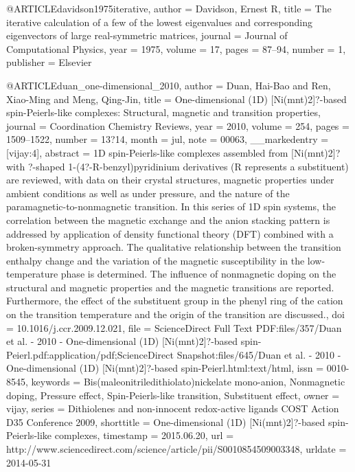 @ARTICLE{davidson1975iterative,
  author = {Davidson, Ernest R},
  title = {The iterative calculation of a few of the lowest eigenvalues and
	corresponding eigenvectors of large real-symmetric matrices},
  journal = {Journal of Computational Physics},
  year = {1975},
  volume = {17},
  pages = {87--94},
  number = {1},
  publisher = {Elsevier}
}

@ARTICLE{duan_one-dimensional_2010,
  author = {Duan, Hai-Bao and Ren, Xiao-Ming and Meng, Qing-Jin},
  title = {One-dimensional (1D) [{Ni}(mnt)2]?-based spin-{Peierls}-like complexes:
	{Structural}, magnetic and transition properties},
  journal = {Coordination Chemistry Reviews},
  year = {2010},
  volume = {254},
  pages = {1509--1522},
  number = {13?14},
  month = jul,
  note = {00063},
  __markedentry = {[vijay:4]},
  abstract = {1D spin-Peierls-like complexes assembled from [Ni(mnt)2]? with ?-shaped
	1-(4?-R-benzyl)pyridinium derivatives (R represents a substituent)
	are reviewed, with data on their crystal structures, magnetic properties
	under ambient conditions as well as under pressure, and the nature
	of the paramagnetic-to-nonmagnetic transition. In this series of
	1D spin systems, the correlation between the magnetic exchange and
	the anion stacking pattern is addressed by application of density
	functional theory (DFT) combined with a broken-symmetry approach.
	The qualitative relationship between the transition enthalpy change
	and the variation of the magnetic susceptibility in the low-temperature
	phase is determined. The influence of nonmagnetic doping on the structural
	and magnetic properties and the magnetic transitions are reported.
	Furthermore, the effect of the substituent group in the phenyl ring
	of the cation on the transition temperature and the origin of the
	transition are discussed.},
  doi = {10.1016/j.ccr.2009.12.021},
  file = {ScienceDirect Full Text PDF:files/357/Duan et al. - 2010 - One-dimensional (1D) [Ni(mnt)2]?-based spin-Peierl.pdf:application/pdf;ScienceDirect Snapshot:files/645/Duan et al. - 2010 - One-dimensional (1D) [Ni(mnt)2]?-based spin-Peierl.html:text/html},
  issn = {0010-8545},
  keywords = {Bis(maleonitriledithiolato)nickelate mono-anion, Nonmagnetic doping,
	Pressure effect, Spin-Peierls-like transition, Substituent effect},
  owner = {vijay},
  series = {Dithiolenes and non-innocent redox-active ligands {COST} {Action}
	{D}35 {Conference} 2009},
  shorttitle = {One-dimensional (1D) [{Ni}(mnt)2]?-based spin-{Peierls}-like complexes},
  timestamp = {2015.06.20},
  url = {http://www.sciencedirect.com/science/article/pii/S0010854509003348},
  urldate = {2014-05-31}
}

